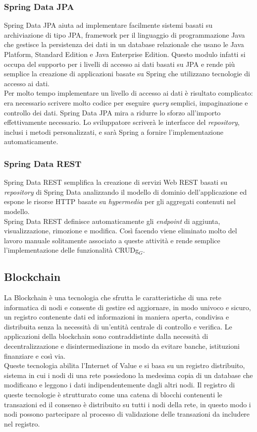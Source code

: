 \subsubsection{Spring Data JPA}
Spring Data JPA aiuta ad implementare facilmente sistemi basati su archiviazione di tipo JPA, framework per il linguaggio di programmazione Java che gestisce la persistenza dei dati in un database relazionale che usano le Java Platform, Standard Edition e Java Enterprise Edition. Questo modulo infatti si occupa del supporto per i livelli di accesso ai dati basati su JPA e rende più semplice la creazione di applicazioni basate su Spring che utilizzano tecnologie di accesso ai dati.\\
Per molto tempo implementare un livello di accesso ai dati è risultato complicato: era necessario scrivere molto codice per eseguire \textit{query} semplici, impaginazione e controllo dei dati. Spring Data JPA mira a ridurre lo sforzo all'importo effettivamente necessario. Lo sviluppatore scriverà le interfacce del \textit{repository}, inclusi i metodi personalizzati, e sarà Spring a fornire l'implementazione automaticamente.

\subsubsection{Spring Data REST}
Spring Data REST semplifica la creazione di servizi Web REST basati su \textit{repository} di Spring Data analizzando il modello di dominio dell'applicazione ed espone le risorse HTTP basate su \textit{hypermedia} per gli aggregati contenuti nel modello.\\
Spring Data REST definisce automaticamente gli \textit{endpoint} di aggiunta, visualizzazione, rimozione e modifica. Così facendo viene eliminato molto del lavoro manuale solitamente associato a queste attività e rende semplice l'implementazione delle funzionalità \gls{CRUDg}$_G$.  

\subsection{Blockchain}

La Blockchain è una tecnologia che sfrutta le caratteristiche di una rete informatica di nodi e consente di gestire ed aggiornare, in modo univoco e sicuro, un registro contenente dati ed informazioni in maniera aperta, condivisa e distribuita senza la necessità di un'entità centrale di controllo e verifica. Le applicazioni della blockchain sono contraddistinte dalla necessità di decentralizzazione e disintermediazione in modo da evitare banche, istituzioni finanziare e così via.\\
Queste tecnologia abilita l'Internet of Value e si basa su un registro distribuito, sistema in cui i nodi di una rete possiedono la medesima copia di un database che modificano e leggono i dati indipendentemente dagli altri nodi. Il registro di queste tecnologie è strutturato come una catena di blocchi contenenti le transazioni ed il consenso è distribuito su tutti i nodi della rete, in questo modo i nodi possono partecipare al processo di validazione delle transazioni da includere nel registro.

